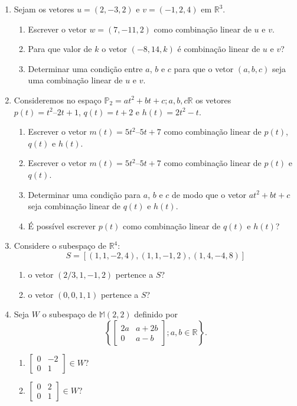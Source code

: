 \begin{enumerate}

\item 	Sejam os vetores $u = (2,-3,2)$ e $v = (-1,2,4)$ em $\mathbb{R}^3$.
\begin{enumerate}[label=(\alph*)]
\item 	Escrever o vetor $w = (7,-11,2)$ como combinação linear de $u$ e $v$.
\item 	Para que valor de $k$ o vetor $( -8, 14, k)$ é combinação linear de $u$ e $v$?
\item 	Determinar uma condição entre $a$, $b$ e $c$ para que o vetor $(a,b,c)$ seja uma combinação linear de $u$ e $v$.
\end{enumerate}


\item	Consideremos no espaço $\mathbb{P}_2= {at^2 + bt + c; a, b,c \mathbb{R}}$ os vetores $p(t) = t^2 – 2t +1$,
      $q(t) = t + 2$ e $h(t)= 2t^2-t$.
\begin{enumerate}[label=(\alph*)]
\item	Escrever o vetor $m(t) = 5t^2 – 5t + 7$ como combinação linear de $p(t)$, $q(t)$ e $h(t)$.
\item	Escrever o vetor $m(t) = 5t^2 – 5t + 7$ como combinação linear de $p(t)$ e $q(t)$.
\item	Determinar uma condição para $a$, $b$ e $c$ de modo que o vetor $at^2 + bt + c$ seja combinação linear de
      $q(t)$ e $h(t)$.
\item	É possível escrever $p(t)$ como combinação linear de $q(t)$ e $h(t)$?
\end{enumerate}

\item	Considere o subespaço de $\mathbb{R}^4$:
 $$S = [(1,1,-2,4), (1,1,-1,2),(1,4,-4,8)]$$
\begin{enumerate}[label=(\alph*)]
\item	o vetor $(2/3, 1, -1, 2)$ pertence a $S$?
\item	o vetor $(0,0,1,1)$ pertence a $S$?
\end{enumerate}

\item Seja $W$ o subespaço de $\mathbb{M}(2,2)$ definido por $$\left\{ \begin{bmatrix}2a & a+2b \\ 0 & a-b \end{bmatrix}; a,b \in \mathbb{R} \right\}.$$
\begin{enumerate}[label=(\alph*)]
\item $ \begin{bmatrix}0 & -2 \\ 0 & 1 \end{bmatrix} \in W$?
\item  $ \begin{bmatrix}0 & 2 \\ 0 & 1 \end{bmatrix} \in W$?
\end{enumerate}



\end{enumerate}
